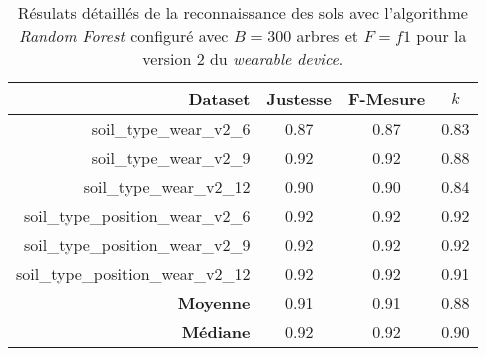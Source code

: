 \begin{table}[H]\renewcommand{\arraystretch}{0.5}
	\centering
	\caption{Résulats détaillés de la reconnaissance des sols avec l'algorithme \textit{Random Forest} configuré avec $B=300$ arbres et $F=f1$ pour la version 2 du \textit{wearable device}.}
	\label{tab:tab:rf-300-f1-wear-v2}
	\begin{tabular}{@{}rccc@{}}
		\toprule
			\textbf{Dataset} & \textbf{Justesse} & \textbf{F-Mesure} & \textbf{$k$} \\
		\midrule
			soil\_type\_wear\_v2\_6 & 0.87 & 0.87 & 0.83 \\
			soil\_type\_wear\_v2\_9 & 0.92 & 0.92 & 0.88 \\
			soil\_type\_wear\_v2\_12 & 0.90 & 0.90 & 0.84 \\
			soil\_type\_position\_wear\_v2\_6 & 0.92 & 0.92 & 0.92 \\
			soil\_type\_position\_wear\_v2\_9 & 0.92 & 0.92 & 0.92 \\
			soil\_type\_position\_wear\_v2\_12 & 0.92 & 0.92 & 0.91 \\
			\textbf{Moyenne} & 0.91 & 0.91 & 0.88 \\
			\textbf{Médiane} & 0.92 & 0.92 & 0.90 \\
		\bottomrule
	\end{tabular}
\end{table}

